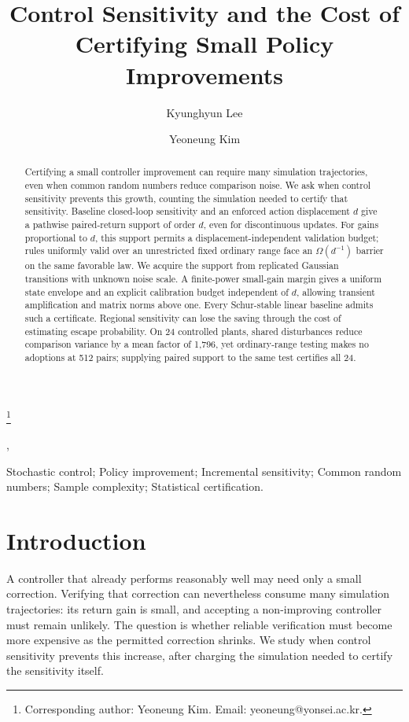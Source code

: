 \documentclass[twocolumn,nameyear]{autart}
\begin{document}
\begin{frontmatter}
\title{Control Sensitivity and the Cost of Certifying Small Policy Improvements}
\thanks[cor1]{Corresponding author: Yeoneung Kim. Email: yeoneung@yonsei.ac.kr.}
\author[gachon]{Kyunghyun Lee},
\author[yonsei]{Yeoneung Kim}
\address[gachon]{Department of Computer Science, Gachon University,
1342 Seongnam-daero, Sujeong-gu, Seongnam, Gyeonggi-do 13120, Republic of Korea}
\address[yonsei]{Department of Industrial Engineering, Yonsei University,
50 Yonsei-ro, Seodaemun-gu, Seoul 03722, Republic of Korea}
\begin{keyword}
Stochastic control; Policy improvement; Incremental sensitivity;
Common random numbers; Sample complexity; Statistical certification.
\end{keyword}
\begin{abstract}
Certifying a small controller improvement can require many simulation
trajectories, even when common random numbers reduce comparison noise. We ask when
control sensitivity prevents this growth, counting the simulation needed
to certify that sensitivity. Baseline closed-loop sensitivity and an
enforced action displacement $d$ give a pathwise paired-return support
of order $d$, even for discontinuous updates. For gains proportional to
$d$, this support permits a displacement-independent validation budget;
rules uniformly valid over an unrestricted fixed ordinary range face an
$\Omega(d^{-1})$ barrier on the same favorable law. We acquire the support
from replicated Gaussian transitions with unknown noise scale. A
finite-power small-gain margin gives a uniform state envelope and an
explicit calibration budget independent of $d$, allowing transient
amplification and matrix norms above one. Every Schur-stable linear
baseline admits such a certificate. Regional sensitivity can lose the
saving through the cost of estimating escape probability. On 24
controlled plants, shared disturbances reduce comparison variance by a
mean factor of 1,796, yet ordinary-range testing makes no adoptions at
512 pairs; supplying paired support to the same test certifies all 24.
\end{abstract}

\end{frontmatter}

\section{Introduction}
A controller that already performs reasonably well may need only a
small correction. Verifying that correction can nevertheless consume
many simulation trajectories: its return gain is small, and accepting
a non-improving controller must remain unlikely. The question is whether
reliable verification must become more expensive as the permitted
correction shrinks. We study when control sensitivity prevents this
increase, after charging the simulation needed to certify the
sensitivity itself.
\end{document}
